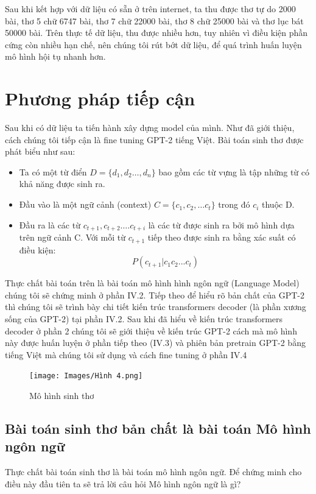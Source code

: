 \documentclass[a4paper]{article}
\theoremstyle{definition}
\begin{document}
Sau khi kết hợp với dữ liệu có sẵn ở trên internet, ta thu được thơ tự do 2000 bài, thơ 5 chữ 6747 bài, thơ 7 chữ 22000 bài, thơ 8 chữ 25000 bài và thơ lục bát 50000 bài. Trên thực tế dữ liệu, thu được nhiều hơn, tuy nhiên vì điều kiện phần cứng còn nhiều hạn chế, nên chúng tôi rút bớt dữ liệu, để quá trình huấn luyện mô hình hội tụ nhanh hơn. 
\newpage
\section{Phương pháp tiếp cận}

Sau khi có dữ liệu ta tiến hành xây dựng model của mình. Như đã giới thiệu, cách chúng tôi tiếp cận là fine tuning GPT-2 tiếng Việt. 
Bài toán sinh thơ được phát biểu như sau:
\begin{itemize}
    \item Ta  có một từ điển $ D = \{d_1, d_2 … ,d_n \}$ bao gồm các từ vựng là tập những từ có khả năng được sinh ra. 
    \item Đầu vào là một ngữ cảnh (context) $C = \{c_1, c_2, …c_t \}$ trong đó $c_i$ thuộc D.
    \item Đầu ra là các từ $c_{t+1}, c_{t+2} …. c_{t+i}$ là các từ được sinh ra bởi mô hình dựa trên ngữ cảnh C. Với mỗi từ $c_{t+1}$ tiếp theo được sinh ra bằng xác suất có điều kiện: 
$$P(c_{t+1}|c_1c_2...c_t)$$
\end{itemize}
Thực chất bài toán trên là bài toán mô hình hình ngôn ngữ (Language Model) chúng tôi sẽ chứng minh ở phần IV.2. Tiếp theo để hiểu rõ bản chất của GPT-2 thì chúng tôi sẽ trình bày chi tiết kiến trúc transformers decoder (là phần xương sống của GPT-2) tại phần IV.2. Sau khi đã hiểu về kiến trúc transformers decoder ở phần 2 chúng tôi sẽ giới thiệu về kiến trúc GPT-2 cách mà mô hình này được huấn luyện ở phần tiếp theo (IV.3) và phiên bản pretrain GPT-2 bằng tiếng Việt mà chúng tôi sử dụng và cách fine tuning ở phần IV.4 
\begin{figure}[h!]
\begin{center}
\texttt{[image: Images/Hình 4.png]} \\[0.2in]

\caption{Mô hình sinh thơ}
\end{center}
\end{figure}
\subsection{Bài toán sinh thơ bản chất là bài toán Mô hình ngôn ngữ}
Thực chất bài toán sinh thơ là  bài toán mô hình ngôn ngữ. Để chứng minh cho điều này đầu tiên ta sẽ trả lời câu hỏi Mô hình ngôn ngữ là gì?
\end{document}
